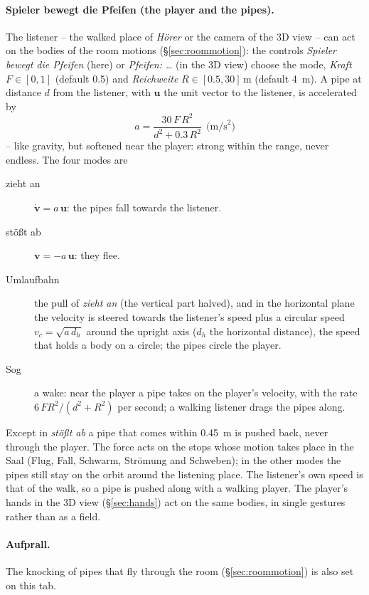 \documentclass[11pt,a4paper,parskip=half,DIV=11,toc=bibliography]{scrartcl}
\newcommand{\ui}[1]{\emph{#1}}                 %
\begin{document}
\paragraph{Spieler bewegt die Pfeifen (the player and the pipes).} The listener -- the walked place of \ui{Hörer} or the camera of
the 3D view -- can act on the bodies of the room motions (\S\ref{sec:roommotion}): the controls \ui{Spieler bewegt die Pfeifen}
(here) or \ui{Pfeifen: \dots} (in the 3D view) choose the mode, \ui{Kraft} $F\in[0,1]$ (default 0.5) and \ui{Reichweite} $R\in[0.5,30]$\,m (default \SI{4}{m}).
A pipe at distance $d$ from the listener, with $\mathbf u$ the unit vector to the listener, is accelerated by
\begin{equation}
  a = \frac{30\,F\,R^2}{d^2 + 0.3\,R^2}\ \ \text{(m/s}^2)
\end{equation}
-- like gravity, but softened near the player: strong within the range, never endless. The four modes are
\begin{description}
  \item[zieht an] $\dot{\mathbf v} = a\,\mathbf u$: the pipes fall towards the listener.
  \item[stößt ab] $\dot{\mathbf v} = -a\,\mathbf u$: they flee.
  \item[Umlaufbahn] the pull of \emph{zieht an} (the vertical part halved), and in the horizontal plane the velocity is steered towards
        the listener's speed plus a circular speed $v_c=\sqrt{a\,d_h}$ around the upright axis ($d_h$ the horizontal distance), the speed
        that holds a body on a circle; the pipes circle the player.
  \item[Sog] a wake: near the player a pipe takes on the player's velocity, with the rate $6\,F R^2/(d^2+R^2)$ per second; a walking
        listener drags the pipes along.
\end{description}
Except in \emph{stößt ab} a pipe that comes within \SI{0.45}{m} is pushed back, never through the player. The force acts on the stops
whose motion takes place in the Saal (Flug, Fall, Schwarm, Strömung and Schweben); in the other modes the pipes still stay on the orbit
around the listening place. The listener's own speed is that of the walk, so a pipe is pushed along with a walking player. The player's
hands in the 3D view (\S\ref{sec:hands}) act on the same bodies, in single gestures rather than as a field.

\paragraph{Aufprall.} The knocking of pipes that fly through the room (\S\ref{sec:roommotion}) is also set on this tab.
\end{document}
